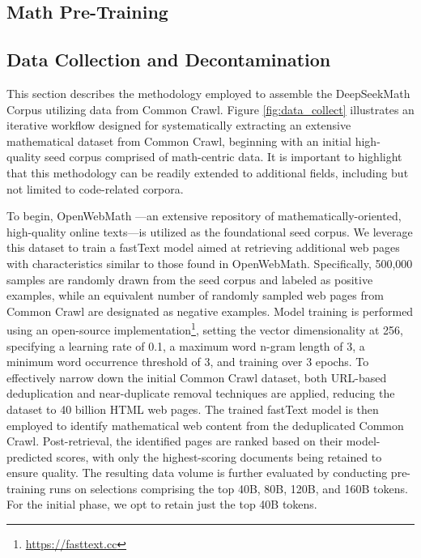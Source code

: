 \begin{itemize}[topsep=0pt]
\section{Math Pre-Training}

\subsection{Data Collection and Decontamination} This section describes the methodology employed to assemble the DeepSeekMath Corpus utilizing data from Common Crawl. Figure \ref{fig:data_collect} illustrates an iterative workflow designed for systematically extracting an extensive mathematical dataset from Common Crawl, beginning with an initial high-quality seed corpus comprised of math-centric data. It is important to highlight that this methodology can be readily extended to additional fields, including but not limited to code-related corpora.

To begin, OpenWebMath \citep{openwebmath}—an extensive repository of mathematically-oriented, high-quality online texts—is utilized as the foundational seed corpus. We leverage this dataset to train a fastText model \citep{joulin2016fasttext} aimed at retrieving additional web pages with characteristics similar to those found in OpenWebMath. Specifically, 500,000 samples are randomly drawn from the seed corpus and labeled as positive examples, while an equivalent number of randomly sampled web pages from Common Crawl are designated as negative examples. Model training is performed using an open-source implementation\footnote{\url{https://fasttext.cc}}, setting the vector dimensionality at 256, specifying a learning rate of 0.1, a maximum word n-gram length of 3, a minimum word occurrence threshold of 3, and training over 3 epochs. To effectively narrow down the initial Common Crawl dataset, both URL-based deduplication and near-duplicate removal techniques are applied, reducing the dataset to 40 billion HTML web pages. The trained fastText model is then employed to identify mathematical web content from the deduplicated Common Crawl. Post-retrieval, the identified pages are ranked based on their model-predicted scores, with only the highest-scoring documents being retained to ensure quality. The resulting data volume is further evaluated by conducting pre-training runs on selections comprising the top 40B, 80B, 120B, and 160B tokens. For the initial phase, we opt to retain just the top 40B tokens.


\end{itemize}
